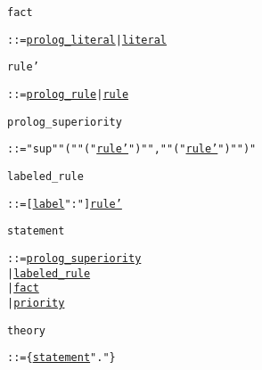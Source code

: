 
\begin{alltt}
\hypertarget{factP\newLinkVer}{fact} ::= \hyperlink{prolog_literalP\linkVer}{prolog_literal} | \hyperlink{literalP\linkVer}{literal}

\hypertarget{rule_P\newLinkVer}{rule'} ::= \hyperlink{prolog_ruleP\linkVer}{prolog_rule} | \hyperlink{ruleP\linkVer}{rule}

\hypertarget{prolog_superiorityP\newLinkVer}{prolog_superiority}
   ::= "sup" "(" "("  \hyperlink{rule_P\linkVer}{rule'} ")" "," "(" \hyperlink{rule_P\linkVer}{rule'} ")" ")"
   
\hypertarget{labeled_ruleP\newLinkVer}{labeled_rule} ::= [\hyperlink{labelP\linkVer}{label} ":"] \hyperlink{rule_P\linkVer}{rule'}

\hypertarget{statementP\newLinkVer}{statement} ::=   \hyperlink{prolog_superiorityP\linkVer}{prolog_superiority}
              | \hyperlink{labeled_ruleP\linkVer}{labeled_rule}
              | \hyperlink{factP\linkVer}{fact} 
              | \hyperlink{priorityP\linkVer}{priority}

\hypertarget{theoryP\newLinkVer}{theory} ::= \verb"{"\hyperlink{statementP\linkVer}{statement} "."\verb"}"
\end{alltt}
